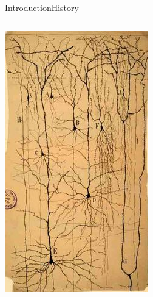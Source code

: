 \documentclass[10pt,compress]{beamer} %
\begin{document}
\begin{frame}{Introduction}{History}
\begin{columns}
		\includegraphics[width=\linewidth]{figs/neuron-ryc.jpg}
	   \end{columns}
\end{frame}
\end{document}
